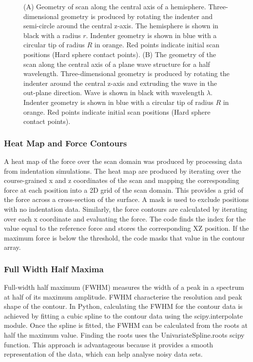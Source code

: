 \begin{figure}[H]
    \caption{\label{fig: Compression Simulation dynamics}(A) Geometry of scan along the central axis of a hemisphere. Three-dimensional geometry is produced by rotating the indenter and semi-circle around the central z-axis. The hemisphere is shown in black with a radius $r$. Indenter geometry is shown in blue with a circular tip of radius $R$ in orange. Red points indicate initial scan positions (Hard sphere contact points). (B) The geometry of the scan along the central axis of a plane wave structure for a half wavelength. Three-dimensional geometry is produced by rotating the indenter around the central z-axis and extruding the wave in the out-plane direction. Wave is shown in black with wavelength $\lambda$. Indenter geometry is shown in blue with a circular tip of radius $R$ in orange. Red points indicate initial scan positions (Hard sphere contact points). }
\end{figure}

\subsubsection{Heat Map and Force Contours}

A heat map of the force over the scan domain was produced by processing data from indentation simulations. The heat map are produced by iterating over the course-grained x and z coordinates of the scan and mapping the corresponding force at each position into a 2D grid of the scan domain. This provides a grid of the force across a cross-section of the surface. A mask is used to exclude positions with no indentation data. Similarly, the force contours are calculated by iterating over each x coordinate and evaluating the force. The code finds the index for the value equal to the reference force and stores the corresponding XZ position. If the maximum force is below the threshold, the code masks that value in the contour array. 


\subsubsection{Full Width Half Maxima}

Full-width half maximum (FWHM) measures the width of a peak in a spectrum at half of its maximum amplitude. FWHM characterise the resolution and peak shape of the contour. In Python, calculating the FWHM for the contour data is achieved by fitting a cubic spline to the contour data using the scipy.interpolate module. Once the spline is fitted, the FWHM can be calculated from the roots at half the maximum value. Finding the roots uses the UnivariateSpline.roots scipy function. This approach is advantageous because it provides a smooth representation of the data, which can help analyse noisy data sets.

